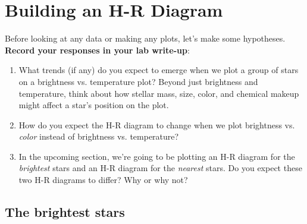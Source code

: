 \documentclass[11pt]{article}
\begin{document}
\section{Building an H-R Diagram}
Before looking at any data or making any plots, let's make some hypotheses. \textbf{Record your responses in your lab write-up}:
\begin{enumerate}
    \item What trends (if any) do you expect to emerge when we plot a group of stars on a brightness vs. temperature plot? Beyond just brightness and temperature, think about how stellar mass, size, color, and chemical makeup might affect a star's position on the plot.
    
    \item How do you expect the H-R diagram to change when we plot brightness vs. \emph{color} instead of brightness vs. temperature?
    
    \item In the upcoming section, we're going to be plotting an H-R diagram for the \emph{brightest} stars and an H-R diagram for the \emph{nearest} stars. Do you expect these two H-R diagrams to differ? Why or why not? 
    
\end{enumerate}

\subsection{The brightest stars}
\end{document}
